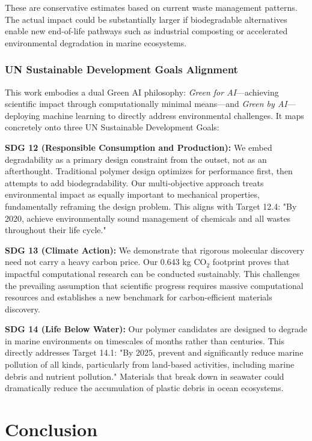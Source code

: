 \documentclass[twocolumn,10pt]{article}
\begin{document}
These are conservative estimates based on current waste management patterns. The actual impact could be substantially larger if biodegradable alternatives enable new end-of-life pathways such as industrial composting or accelerated environmental degradation in marine ecosystems.

\subsubsection{UN Sustainable Development Goals Alignment}

This work embodies a dual Green AI philosophy: \textit{Green for AI}—achieving scientific impact through computationally minimal means—and \textit{Green by AI}—deploying machine learning to directly address environmental challenges. It maps concretely onto three UN Sustainable Development Goals:

\textbf{SDG 12 (Responsible Consumption and Production):} We embed degradability as a primary design constraint from the outset, not as an afterthought. Traditional polymer design optimizes for performance first, then attempts to add biodegradability. Our multi-objective approach treats environmental impact as equally important to mechanical properties, fundamentally reframing the design problem. This aligns with Target 12.4: "By 2020, achieve environmentally sound management of chemicals and all wastes throughout their life cycle."

\textbf{SDG 13 (Climate Action):} We demonstrate that rigorous molecular discovery need not carry a heavy carbon price. Our 0.643 kg CO$_2$ footprint proves that impactful computational research can be conducted sustainably. This challenges the prevailing assumption that scientific progress requires massive computational resources and establishes a new benchmark for carbon-efficient materials discovery.

\textbf{SDG 14 (Life Below Water):} Our polymer candidates are designed to degrade in marine environments on timescales of months rather than centuries. This directly addresses Target 14.1: "By 2025, prevent and significantly reduce marine pollution of all kinds, particularly from land-based activities, including marine debris and nutrient pollution." Materials that break down in seawater could dramatically reduce the accumulation of plastic debris in ocean ecosystems.


\section{Conclusion}
\end{document}
